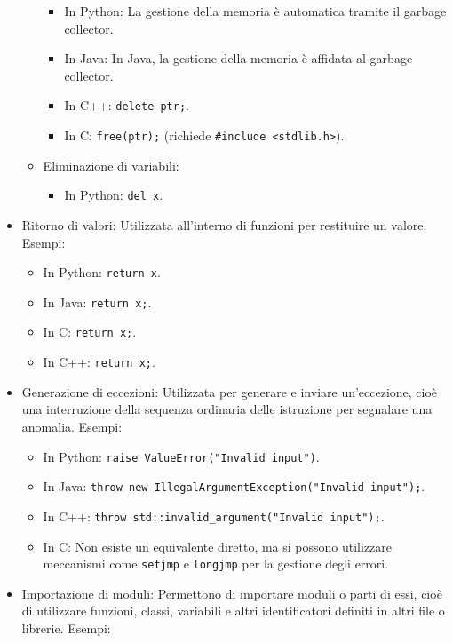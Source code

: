 \documentclass[
  letterpaper,
]{scrbook}
\providecommand{\tightlist}{%
  \setlength{\itemsep}{0pt}\setlength{\parskip}{0pt}}\usepackage{longtable,booktabs,array}
\begin{document}
\begin{itemize}
\begin{itemize}
    \begin{itemize}
    \tightlist
    \item
      In Python: La gestione della memoria è automatica tramite il
      garbage collector.
    \item
      In Java: In Java, la gestione della memoria è affidata al garbage
      collector.
    \item
      In C++: \texttt{delete\ ptr;}.
    \item
      In C: \texttt{free(ptr);} (richiede
      \texttt{\#include\ \textless{}stdlib.h\textgreater{}}).
    \end{itemize}
  \item
    Eliminazione di variabili:

    \begin{itemize}
    \tightlist
    \item
      In Python: \texttt{del\ x}.
    \end{itemize}
  \end{itemize}
\item
  Ritorno di valori: Utilizzata all'interno di funzioni per restituire
  un valore. Esempi:

  \begin{itemize}
  \tightlist
  \item
    In Python: \texttt{return\ x}.
  \item
    In Java: \texttt{return\ x;}.
  \item
    In C: \texttt{return\ x;}.
  \item
    In C++: \texttt{return\ x;}.
  \end{itemize}
\item
  Generazione di eccezioni: Utilizzata per generare e inviare
  un'eccezione, cioè una interruzione della sequenza ordinaria delle
  istruzione per segnalare una anomalia. Esempi:

  \begin{itemize}
  \tightlist
  \item
    In Python: \texttt{raise\ ValueError("Invalid\ input")}.
  \item
    In Java:
    \texttt{throw\ new\ IllegalArgumentException("Invalid\ input");}.
  \item
    In C++: \texttt{throw\ std::invalid\_argument("Invalid\ input");}.
  \item
    In C: Non esiste un equivalente diretto, ma si possono utilizzare
    meccanismi come \texttt{setjmp} e \texttt{longjmp} per la gestione
    degli errori.
  \end{itemize}
\item
  Importazione di moduli: Permettono di importare moduli o parti di
  essi, cioè di utilizzare funzioni, classi, variabili e altri
  identificatori definiti in altri file o librerie. Esempi:


\end{itemize}
\end{document}
